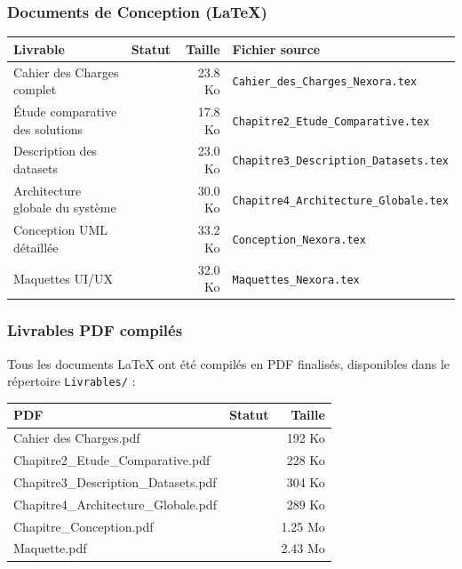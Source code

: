 \documentclass[12pt,a4paper]{article}
\newcommand{\cmark}{\textcolor{vert}{\ding{51}}}
\begin{document}
\subsubsection{Documents de Conception (LaTeX)}

\begin{center}
\renewcommand{\arraystretch}{1.3}
\begin{tabular}{|l|c|r|l|}
\hline
\rowcolor{bleu!15}
\textbf{Livrable} & \textbf{Statut} & \textbf{Taille} & \textbf{Fichier source} \\
\hline
Cahier des Charges complet & \cmark & 23.8 Ko & \texttt{Cahier\_des\_Charges\_Nexora.tex} \\
\hline
Étude comparative des solutions & \cmark & 17.8 Ko & \texttt{Chapitre2\_Etude\_Comparative.tex} \\
\hline
Description des datasets & \cmark & 23.0 Ko & \texttt{Chapitre3\_Description\_Datasets.tex} \\
\hline
Architecture globale du système & \cmark & 30.0 Ko & \texttt{Chapitre4\_Architecture\_Globale.tex} \\
\hline
Conception UML détaillée & \cmark & 33.2 Ko & \texttt{Conception\_Nexora.tex} \\
\hline
Maquettes UI/UX & \cmark & 32.0 Ko & \texttt{Maquettes\_Nexora.tex} \\
\hline
\end{tabular}
\end{center}

\subsubsection{Livrables PDF compilés}

Tous les documents LaTeX ont été compilés en PDF finalisés, disponibles dans le répertoire \texttt{Livrables/} :

\begin{center}
\renewcommand{\arraystretch}{1.3}
\begin{tabular}{|l|c|r|}
\hline
\rowcolor{bleu!15}
\textbf{PDF} & \textbf{Statut} & \textbf{Taille} \\
\hline
Cahier des Charges.pdf & \cmark & 192 Ko \\
\hline
Chapitre2\_Etude\_Comparative.pdf & \cmark & 228 Ko \\
\hline
Chapitre3\_Description\_Datasets.pdf & \cmark & 304 Ko \\
\hline
Chapitre4\_Architecture\_Globale.pdf & \cmark & 289 Ko \\
\hline
Chapitre\_Conception.pdf & \cmark & 1.25 Mo \\
\hline
Maquette.pdf & \cmark & 2.43 Mo \\
\hline
\end{tabular}
\end{center}
\end{document}
